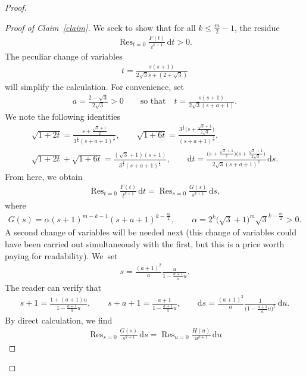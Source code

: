 \documentclass[pdftex]{sigma}
\numberwithin{equation}{section}
\begin{document}
\begin{proof}
\begin{proof}[Proof of Claim~\ref{claim}]
We seek to show that for all $k\leq \frac{m}{2}-1$, the residue
\begin{gather*}
\operatorname{Res}_{t=0} \frac{F(t)}{t^{k+1}} \,{\mathrm dt}>0.
\end{gather*}
The peculiar change of variables
\begin{gather*}
t=\frac{s(s+1)}{2\sqrt{3}s+(2+\sqrt{3})}
\end{gather*}
will simplify the calculation.
For convenience, set
\begin{gather*}
a=\frac{2-\sqrt{3}}{2\sqrt{3}}>0\qquad\text{so that}\quad t=\frac{s(s+1)}{2\sqrt{3}(s+a+1)}.
\end{gather*}
We note the following identities
\begin{gather*}
\sqrt{1+2t}=\frac{s+\frac{\sqrt{3}+1}{2}}{3^{\frac{1}{4}} (s+a+1)^{\frac{1}{2}}}, \qquad \sqrt{1+6t}=\frac{3^{\frac{1}{4}}\big(s+\frac{\sqrt{3}+1}{2\sqrt{3}}\big)}{(s+a+1)^{\frac{1}{2}}},
\\
\sqrt{1+2t}+\sqrt{1+6t}=\frac{(\sqrt{3}+1)(s+1)}{3^{\frac{1}{4}}(s+a+1)^{\frac{1}{2}}},\qquad
{\mathrm dt}=\frac{\big(s+\frac{\sqrt{3}+1}{2}\big)\big(s+\frac{\sqrt{3}+1}{2\sqrt{3}}\big)}{2\sqrt{3} (s+a+1)^2}\,{\mathrm ds}.
\end{gather*}
From here, we obtain
\begin{gather*}
\operatorname{Res}_{t=0} \frac{F(t)}{t^{k+1}} \,{\mathrm dt}=\operatorname{Res}_{s=0} \frac{G(s)}{s^{k+1}} \,{\mathrm ds},
\end{gather*}
where
\begin{gather*}
G(s)=\alpha (s+1)^{m-k-1} (s+a+1)^{k-\frac{m}{2}}, \qquad
\alpha=2^k \big(\sqrt{3}+1\big)^{m} \sqrt{3}^{k-\frac{m}{2}}>0.
\end{gather*}
A second change of variables will be needed next (this change of variables could have been carried out simultaneously with the first, but this is a price worth paying for readability). We~set
\begin{gather*}
s=\frac{(a+1)^2}{a} \frac{u}{1-\frac{a+1}{a}u}.
\end{gather*}
The reader can verify that
\begin{gather*}
s+1=\frac{1+(a+1)u}{1-\frac{a+1}{a}u}, \qquad s+a+1=\frac{a+1}{1-\frac{a+1}{a}u}, \qquad
{\mathrm ds}=\frac{(a+1)^2}{a} \frac{1}{\big(1-\frac{a+1}{a}u\big)^2}\,{\mathrm du}.
\end{gather*}
By direct calculation, we find
\begin{gather*}
\operatorname{Res}_{s=0} \frac{G(s)}{s^{k+1}}\,{\mathrm ds}=\operatorname{Res}_{u=0} \frac{H(u)}{u^{k+1}}\,{\mathrm du}

\end{gather*}
\end{proof}
\end{proof}
\end{document}
